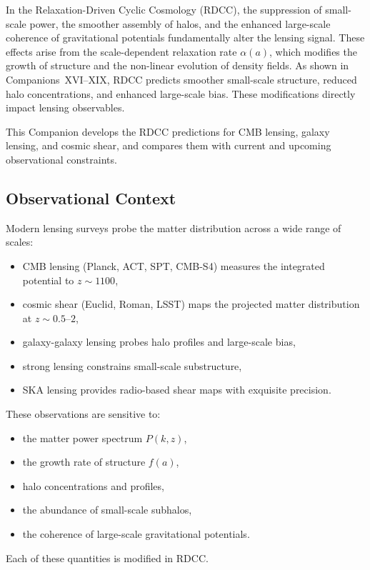 \documentclass[11pt,a4paper]{article}
\begin{document}
In the Relaxation-Driven Cyclic Cosmology (RDCC), the suppression of small-scale power,
the smoother assembly of halos, and the enhanced large-scale coherence of gravitational
potentials fundamentally alter the lensing signal. These effects arise from the scale-dependent
relaxation rate $\alpha(a)$, which modifies the growth of structure and the non-linear evolution
of density fields. As shown in Companions~XVI–XIX, RDCC predicts smoother small-scale
structure, reduced halo concentrations, and enhanced large-scale bias. These modifications
directly impact lensing observables.

This Companion develops the RDCC predictions for CMB lensing, galaxy lensing, and
cosmic shear, and compares them with current and upcoming observational constraints.

\subsection{Observational Context}

Modern lensing surveys probe the matter distribution across a wide range of scales:
\begin{itemize}
\item CMB lensing (Planck, ACT, SPT, CMB-S4) measures the integrated potential to $z \sim 1100$,
\item cosmic shear (Euclid, Roman, LSST) maps the projected matter distribution at $z \sim 0.5$–$2$,
\item galaxy-galaxy lensing probes halo profiles and large-scale bias,
\item strong lensing constrains small-scale substructure,
\item SKA lensing provides radio-based shear maps with exquisite precision.
\end{itemize}

These observations are sensitive to:
\begin{itemize}
\item the matter power spectrum $P(k,z)$,
\item the growth rate of structure $f(a)$,
\item halo concentrations and profiles,
\item the abundance of small-scale subhalos,
\item the coherence of large-scale gravitational potentials.
\end{itemize}

Each of these quantities is modified in RDCC.
\end{document}
